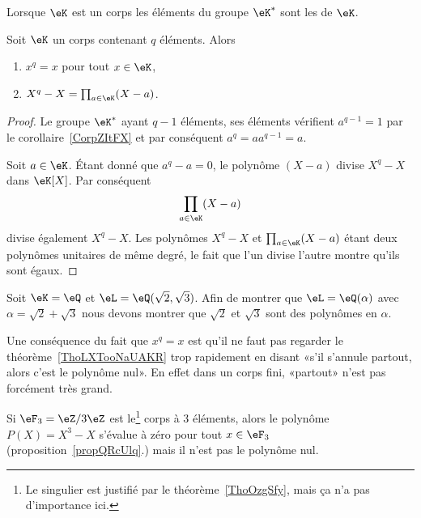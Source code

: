 Lorsque \( \eK\) est un corps les éléments du groupe \( \eK^*\) sont les  de \( \eK\).
\begin{proposition}     \label{propQRcUlq}
    Soit \( \eK\) un corps contenant \( q\) éléments. Alors
    \begin{enumerate}
        \item
            \( x^q=x\) pour tout \( x\in \eK\),
        \item
            \( X^q-X=\prod_{a\in \eK}(X-a)\).
    \end{enumerate}
\end{proposition}

\begin{proof}
    Le groupe \( \eK^*\) ayant \( q-1\) éléments, ses éléments vérifient \( a^{q-1}=1\) par le corollaire~\ref{CorpZItFX} et par conséquent \( a^q=aa^{q-1}=a \).

    Soit \( a\in \eK\). Étant donné que \( a^q-a=0\), le polynôme \( (X-a)\) divise \( X^q-X\) dans \( \eK[X]\). Par conséquent
    \begin{equation}
        \prod_{a\in \eK}(X-a)
    \end{equation}
    divise également \( X^q-X\). Les polynômes \( X^q-X\) et \( \prod_{a\in \eK}(X-a)\) étant deux polynômes unitaires de même degré, le fait que l'un divise l'autre montre qu'ils sont égaux.
\end{proof}

\begin{example}
    Soit \( \eK=\eQ\) et \( \eL=\eQ(\sqrt{2},\sqrt{3})\). Afin de montrer que \( \eL=\eQ(\alpha)\) avec \( \alpha=\sqrt{2}+\sqrt{3}\) nous devons montrer que \( \sqrt{2}\) et \( \sqrt{3}\) sont des polynômes en \( \alpha\).
\end{example}

Une conséquence du fait que \( x^q=x\) est qu'il ne faut pas regarder le théorème~\ref{ThoLXTooNaUAKR} trop rapidement en disant «s'il s'annule partout, alors c'est le polynôme nul». En effet dans un corps fini, «partout» n'est pas forcément très grand.

\begin{example}\label{exVQBooBMPLkD}
    Si \( \eF_3=\eZ/3\eZ\) est le\footnote{Le singulier est justifié par le théorème~\ref{ThoOzgSfy}, mais ça n'a pas d'importance ici.} corps à \( 3\)
    éléments, alors le polynôme \( P(X)=X^3-X\) s'évalue à zéro pour tout \( x\in \eF_3\) (proposition~\ref{propQRcUlq}.) mais il n'est pas le polynôme nul.
\end{example}

